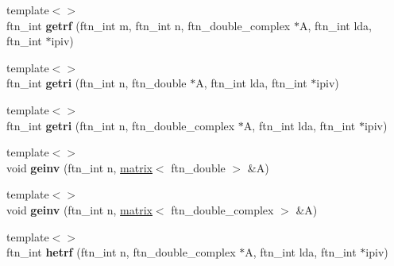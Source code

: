 \begin{DoxyCompactItemize}
\item 
\hypertarget{classsddk_1_1linalg_3_01_c_p_u_01_4_ad4bb1f371dbe519005305f4ea4dfb3a1}{}{\footnotesize template$<$$>$ }\\ftn\+\_\+int {\bfseries getrf} (ftn\+\_\+int m, ftn\+\_\+int n, ftn\+\_\+double\+\_\+complex $\ast$A, ftn\+\_\+int lda, ftn\+\_\+int $\ast$ipiv)\label{classsddk_1_1linalg_3_01_c_p_u_01_4_ad4bb1f371dbe519005305f4ea4dfb3a1}

\item 
\hypertarget{classsddk_1_1linalg_3_01_c_p_u_01_4_ae25de677c1a229e7e40e99575a9a71bb}{}{\footnotesize template$<$$>$ }\\ftn\+\_\+int {\bfseries getri} (ftn\+\_\+int n, ftn\+\_\+double $\ast$A, ftn\+\_\+int lda, ftn\+\_\+int $\ast$ipiv)\label{classsddk_1_1linalg_3_01_c_p_u_01_4_ae25de677c1a229e7e40e99575a9a71bb}

\item 
\hypertarget{classsddk_1_1linalg_3_01_c_p_u_01_4_aba721ed4913cdfd62daa5bb1cdb6d293}{}{\footnotesize template$<$$>$ }\\ftn\+\_\+int {\bfseries getri} (ftn\+\_\+int n, ftn\+\_\+double\+\_\+complex $\ast$A, ftn\+\_\+int lda, ftn\+\_\+int $\ast$ipiv)\label{classsddk_1_1linalg_3_01_c_p_u_01_4_aba721ed4913cdfd62daa5bb1cdb6d293}

\item 
\hypertarget{classsddk_1_1linalg_3_01_c_p_u_01_4_a3b1e8bcd6d87ea1ad432f85012e2e73e}{}{\footnotesize template$<$$>$ }\\void {\bfseries geinv} (ftn\+\_\+int n, \hyperlink{classsddk_1_1mdarray}{matrix}$<$ ftn\+\_\+double $>$ \&A)\label{classsddk_1_1linalg_3_01_c_p_u_01_4_a3b1e8bcd6d87ea1ad432f85012e2e73e}

\item 
\hypertarget{classsddk_1_1linalg_3_01_c_p_u_01_4_a36587a7c3994e08b1fc7659cb34fd4b2}{}{\footnotesize template$<$$>$ }\\void {\bfseries geinv} (ftn\+\_\+int n, \hyperlink{classsddk_1_1mdarray}{matrix}$<$ ftn\+\_\+double\+\_\+complex $>$ \&A)\label{classsddk_1_1linalg_3_01_c_p_u_01_4_a36587a7c3994e08b1fc7659cb34fd4b2}

\item 
\hypertarget{classsddk_1_1linalg_3_01_c_p_u_01_4_a025f6ae1e333ce3a261440ad11c00786}{}{\footnotesize template$<$$>$ }\\ftn\+\_\+int {\bfseries hetrf} (ftn\+\_\+int n, ftn\+\_\+double\+\_\+complex $\ast$A, ftn\+\_\+int lda, ftn\+\_\+int $\ast$ipiv)\label{classsddk_1_1linalg_3_01_c_p_u_01_4_a025f6ae1e333ce3a261440ad11c00786}


\end{DoxyCompactItemize}
